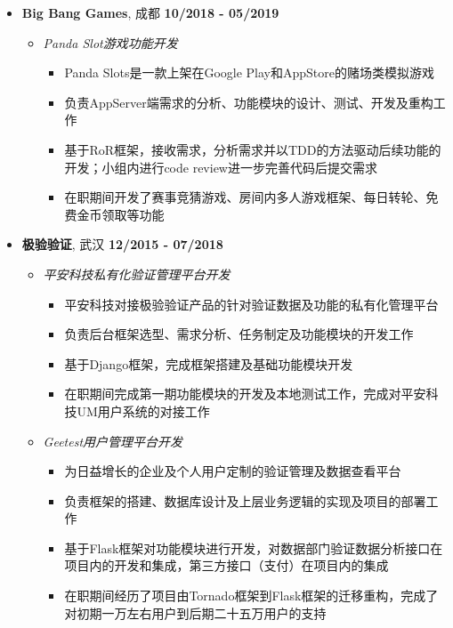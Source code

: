 \documentclass[11pt, a4paper,sans]{moderncv}     %
\begin{document}
\begin{itemize}

  \item{\yahei \textbf{Big Bang Games}, 成都 \hfill\textbf{10/2018 - 05/2019}}
  \begin{itemize}
    \item{\textit{Panda Slot游戏功能开发}}
    \begin{itemize}
      \item { Panda Slots是一款上架在Google Play和AppStore的赌场类模拟游戏}
      \vspace{2pt}
      \item { 负责AppServer端需求的分析、功能模块的设计、测试、开发及重构工作}
      \vspace{2pt}
      \item { 基于RoR框架，接收需求，分析需求并以TDD的方法驱动后续功能的开发；小组内进行code review进一步完善代码后提交需求}
      \vspace{2pt}
      \item { 在职期间开发了赛事竞猜游戏、房间内多人游戏框架、每日转轮、免费金币领取等功能}
    \end{itemize}
  \end{itemize}

  \item{\textbf{极验验证}, 武汉 \hfill\textbf{12/2015 - 07/2018}}
  \begin{itemize}
    \item{\textit{平安科技私有化验证管理平台开发}}
    \begin{itemize}
      \item {  平安科技对接极验验证产品的针对验证数据及功能的私有化管理平台}
      \item {  负责后台框架选型、需求分析、任务制定及功能模块的开发工作}
      \item {  基于Django框架，完成框架搭建及基础功能模块开发}
      \item {  在职期间完成第一期功能模块的开发及本地测试工作，完成对平安科技UM用户系统的对接工作}
    \end{itemize}

    \item{\textit{Geetest用户管理平台开发}}
    \begin{itemize}
      \item {  为日益增长的企业及个人用户定制的验证管理及数据查看平台}
      \item {  负责框架的搭建、数据库设计及上层业务逻辑的实现及项目的部署工作}
      \item {  基于Flask框架对功能模块进行开发，对数据部门验证数据分析接口在项目内的开发和集成，第三方接口（支付）在项目内的集成}
      \item {  在职期间经历了项目由Tornado框架到Flask框架的迁移重构，完成了对初期一万左右用户到后期二十五万用户的支持}
    \end{itemize}


\end{itemize}
\end{itemize}
\end{document}
